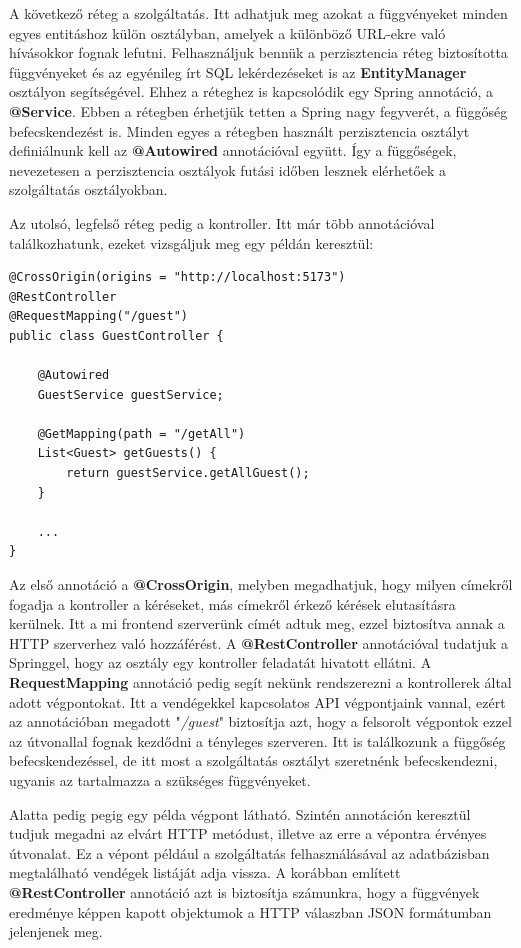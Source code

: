 \documentclass[12pt]{article}
\begin{document}
A következő réteg a szolgáltatás. Itt adhatjuk meg azokat a függvényeket minden egyes entitáshoz külön osztályban, amelyek a különböző URL-ekre való hívásokkor fognak lefutni. Felhasználjuk bennük a perzisztencia réteg biztosította függvényeket és az egyénileg írt SQL lekérdezéseket is az \textbf{EntityManager} osztályon segítségével. Ehhez a réteghez is kapcsolódik egy Spring annotáció, a \textbf{@Service}. Ebben a rétegben érhetjük tetten a Spring nagy fegyverét, a függőség befecskendezést is. Minden egyes a rétegben használt perzisztencia osztályt definiálnunk kell az \textbf{@Autowired} annotációval együtt. Így a függőségek, nevezetesen a perzisztencia osztályok futási időben lesznek elérhetőek a szolgáltatás osztályokban.

Az utolsó, legfelső réteg pedig a kontroller. Itt már több annotációval találkozhatunk, ezeket vizsgáljuk meg egy példán keresztül:
\begin{verbatim}
@CrossOrigin(origins = "http://localhost:5173")
@RestController
@RequestMapping("/guest")
public class GuestController {

    @Autowired
    GuestService guestService;

    @GetMapping(path = "/getAll")
    List<Guest> getGuests() {
        return guestService.getAllGuest();
    }

    ...
}
\end{verbatim}

Az első annotáció a \textbf{@CrossOrigin}, melyben megadhatjuk, hogy milyen címekről fogadja a kontroller a kéréseket, más címekről érkező kérések elutasításra kerülnek. Itt a mi frontend szerverünk címét adtuk meg, ezzel biztosítva annak a HTTP szerverhez való hozzáférést. A \textbf{@RestController} annotációval tudatjuk a Springgel, hogy az osztály egy kontroller feladatát hivatott ellátni. A \textbf{RequestMapping} annotáció pedig segít nekünk rendszerezni a kontrollerek által adott végpontokat. Itt a vendégekkel kapcsolatos API végpontjaink vannal, ezért az annotációban megadott "\textit{/guest}" biztosítja azt, hogy a felsorolt végpontok ezzel az útvonallal fognak kezdődni a tényleges szerveren. Itt is találkozunk a függőség befecskendezéssel, de itt most a szolgáltatás osztályt szeretnénk befecskendezni, ugyanis az tartalmazza a szükséges függvényeket.

Alatta pedig pegig egy példa végpont látható. Szintén annotáción keresztül tudjuk megadni az elvárt HTTP metódust, illetve az erre a vépontra érvényes útvonalat. Ez a vépont például a szolgáltatás felhasználásával az adatbázisban megtalálható vendégek listáját adja vissza. A korábban említett \textbf{@RestController} annotáció azt is biztosítja számunkra, hogy a függvények eredménye képpen kapott objektumok a HTTP válaszban JSON formátumban jelenjenek meg.
\end{document}

